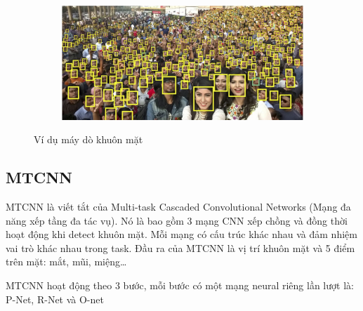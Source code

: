\begin{figure}
    \begin{subfigure}{1.\textwidth}
        \begin{center}
            \includegraphics[width=1.\linewidth]{Chapters/items/chap2_test.jpg}
        \end{center}
        \label{fig: chap2_test}
    \end{subfigure}
    \caption{Ví dụ máy dò khuôn mặt}
\end{figure}

\newpage
\subsection{MTCNN}

MTCNN\cite{mtcnn} là viết tắt của Multi-task Cascaded Convolutional Networks (Mạng đa năng xếp tầng đa tác vụ).
Nó là bao gồm 3 mạng CNN xếp chồng và đồng thời hoạt động khi detect khuôn mặt.
Mỗi mạng có cấu trúc khác nhau và đảm nhiệm vai trò khác nhau trong task.
Đầu ra của MTCNN là vị trí khuôn mặt và 5 điểm trên mặt: mắt, mũi, miệng…

MTCNN hoạt động theo 3 bước, mỗi bước có một mạng neural riêng lần lượt là: P-Net, R-Net và O-net

